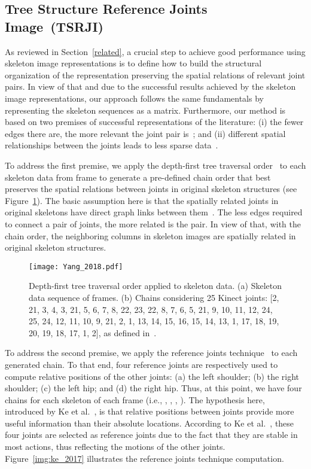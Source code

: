 \documentclass[10pt,conference]{IEEEtran}
\def\metodo{Tree Structure Reference Joints Image}
\def\sigla{TSRJI}
\def\metodosigla{\metodo~(\sigla)}
\begin{document}
\subsection{\metodosigla}

As reviewed in Section~\ref{related}, a crucial step to achieve good performance using skeleton image representations is to define how to build the structural organization of the representation preserving the spatial relations of relevant joint pairs. In view of that and due to the successful results achieved by the skeleton image representations, our approach follows the same fundamentals by representing the skeleton sequences as a matrix. Furthermore, our method is based on two premises of successful representations of the literature: (i) the fewer edges there are, the more relevant the joint pair is~\cite{Yang:2018}; and (ii) different spatial relationships between the joints leads to less sparse data~\cite{Ke:2017}.

To address the first premise, we apply the depth-first tree traversal order~\cite{Yang:2018} to each skeleton data from frame  to generate a pre-defined chain order  that best preserves the spatial relations between joints in original skeleton structures (see Figure~\ref{img:yang_2018}). The basic assumption here is that the spatially related joints in original skeletons have direct graph links between them~\cite{Yang:2018}. The less edges required to connect a pair of joints, the more related is the pair. In view of that, with the  chain order, the neighboring columns in skeleton images are spatially related in original skeleton structures.

\begin{figure}[t]
\centering
	\texttt{[image: Yang\_2018.pdf]}
	\caption{Depth-first tree traversal order applied to skeleton data. (a) Skeleton data sequence of  frames. (b) Chains  considering 25 Kinect joints: [2, 21, 3, 4, 3, 21, 5, 6, 7, 8, 22, 23, 22, 8, 7, 6, 5, 21, 9, 10, 11, 12, 24, 25, 24, 12, 11, 10, 9, 21, 2, 1, 13, 14, 15, 16, 15, 14, 13, 1, 17, 18, 19, 20, 19, 18, 17, 1, 2], as defined in~\cite{Yang:2018}.}
	\label{img:yang_2018}
\end{figure}

To address the second premise, we apply the reference joints technique~\cite{Ke:2017} to each generated  chain. To that end, four reference joints are respectively used to compute relative positions of the other joints: (a) the left shoulder; (b) the right shoulder; (c) the left hip; and (d) the right hip. Thus, at this point, we have four  chains for each skeleton of each frame (i.e., , , , ). The hypothesis here, introduced by Ke et al.~\cite{Ke:2017}, is that relative positions between joints provide more useful information than their absolute locations.  According to Ke et al.~\cite{Ke:2017}, these four joints are selected as reference joints due to the fact that they are stable in most actions, thus reflecting the motions of the other joints. Figure~\ref{img:ke_2017} illustrates the reference joints technique computation.
\end{document}

